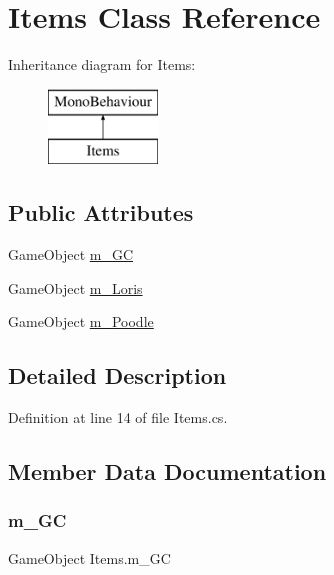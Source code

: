 \hypertarget{class_items}{}\section{Items Class Reference}
\label{class_items}
Inheritance diagram for Items\+:\begin{figure}[H]
\begin{center}
\leavevmode
\includegraphics[height=2.000000cm]{class_items}
\end{center}
\end{figure}
\subsection*{Public Attributes}
\begin{DoxyCompactItemize}
\item 
Game\+Object \mbox{\hyperlink{class_items_af541d8ece6526378b8a8f46322439e78}{m\+\_\+\+GC}}
\item 
Game\+Object \mbox{\hyperlink{class_items_a4b705c4c596f35fe848b41184651741c}{m\+\_\+\+Loris}}
\item 
Game\+Object \mbox{\hyperlink{class_items_a6127453089ccdf137d7e88d156a2e372}{m\+\_\+\+Poodle}}
\end{DoxyCompactItemize}


\subsection{Detailed Description}


Definition at line 14 of file Items.\+cs.



\subsection{Member Data Documentation}
\mbox{\label{class_items_af541d8ece6526378b8a8f46322439e78}} 
\subsubsection{\texorpdfstring{m\+\_\+\+GC}{m\_GC}}
{\footnotesize\ttfamily Game\+Object Items.\+m\+\_\+\+GC}



